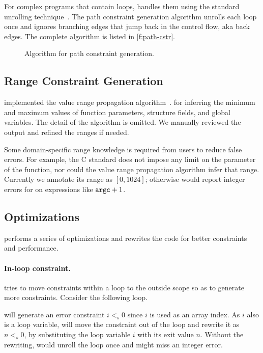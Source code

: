 For complex programs that contain loops, \sys handles them using
the standard unrolling technique~\cite{xie:saturn}.  The path
constraint generation algorithm unrolls each loop once and ignores
branching edges that jump back in the control flow, aka back edges.
The complete algorithm is listed in \autoref{f:path-cstr}.

\begin{figure}

\caption{Algorithm for path constraint generation.}
\label{f:path-cstr}
\end{figure}

\subsection{Range Constraint Generation}
\label{s:gen:range}

\sys implemented the value range propagation
algorithm~\cite{patterson:vrp}.  for inferring the minimum and
maximum values of function parameters, structure fields, and global
variables.  The detail of the algorithm is omitted.  We manually
reviewed the output and refined the ranges if needed.

Some domain-specific range knowledge is required from users to
reduce false errors.  For example, the C standard does not impose
any limit on the  parameter of the  function, nor
could the value range propagation algorithm infer that range.
Currently we annotate its range as $[0, 1024]$; otherwise \sys would
report integer errors for on expressions like $\texttt{argc} + 1$.



\subsection{Optimizations}

\sys performs a series of optimizations and rewrites the code for
better constraints and performance.

\paragraph{In-loop constraint.}
\sys tries to move constraints within a loop to the outside scope
so as to generate more constraints.  Consider the following loop.

\sys will generate an error constraint $i <_s 0$ since $i$ is used
as an array index.  As $i$ also is a loop variable, \sys will move
the constraint out of the loop and rewrite it as $n <_s 0$, by
substituting the loop variable $i$ with its exit value $n$.
%
Without the rewriting, \sys would unroll the loop once and might
miss an integer error.

